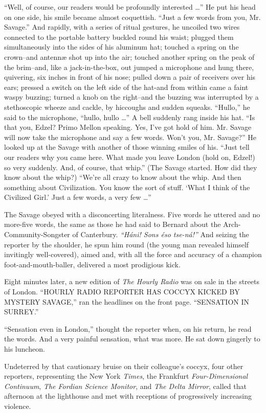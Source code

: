 \documentclass[12pt]{report}
\begin{document}
``Well, of course, our readers would be profoundly interested \ldots{}''
He put his head on one side, his smile became almost coquettish. ``Just
a few words from you, Mr. Savage.'' And rapidly, with a series of ritual
gestures, he uncoiled two wires connected to the portable battery
buckled round his waist; plugged them simultaneously into the sides of
his aluminum hat; touched a spring on the crown--and antennæ shot up
into the air; touched another spring on the peak of the brim--and, like
a jack-in-the-box, out jumped a microphone and hung there, quivering,
six inches in front of his nose; pulled down a pair of receivers over
his ears; pressed a switch on the left side of the hat-and from within
came a faint waspy buzzing; turned a knob on the right--and the buzzing
was interrupted by a stethoscopic wheeze and cackle, by hiccoughs and
sudden squeaks. ``Hullo,'' he said to the microphone, ``hullo, hullo
\ldots{}'' A bell suddenly rang inside his hat. ``Is that you, Edzel?
Primo Mellon speaking. Yes, I've got hold of him. Mr. Savage will now
take the microphone and say a few words. Won't you, Mr. Savage?'' He
looked up at the Savage with another of those winning smiles of his.
``Just tell our readers why you came here. What made you leave London
(hold on, Edzel!) so very suddenly. And, of course, that whip.'' (The
Savage started. How did they know about the whip?) ``We're all crazy to
know about the whip. And then something about Civilization. You know the
sort of stuff. `What I think of the Civilized Girl.' Just a few words, a
very few \ldots{}''

The Savage obeyed with a disconcerting literalness. Five words he
uttered and no more-five words, the same as those he had said to Bernard
about the Arch-Community-Songster of Canterbury. \emph{``Háni! Sons éso
tse-ná!''} And seizing the reporter by the shoulder, he spun him round
(the young man revealed himself invitingly well-covered), aimed and,
with all the force and accuracy of a champion foot-and-mouth-baller,
delivered a most prodigious kick.

Eight minutes later, a new edition of \emph{The Hourly Radio} was on
sale in the streets of London. ``HOURLY RADIO REPORTER HAS COCCYX KICKED
BY MYSTERY SAVAGE,'' ran the headlines on the front page. ``SENSATION IN
SURREY.''

``Sensation even in London,'' thought the reporter when, on his return,
he read the words. And a very painful sensation, what was more. He sat
down gingerly to his luncheon.

Undeterred by that cautionary bruise on their colleague's coccyx, four
other reporters, representing the New York \emph{Times}, the Frankfurt
\emph{Four-Dimensional Continuum}, \emph{The Fordian Science Monitor},
and \emph{The Delta Mirror}, called that afternoon at the lighthouse and
met with receptions of progressively increasing violence.
\end{document}
